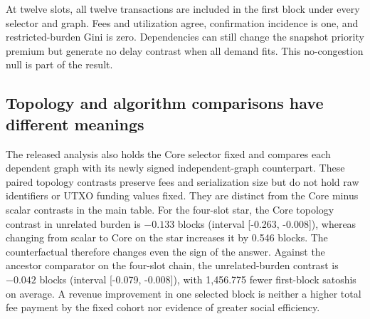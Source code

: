 At twelve slots, all twelve transactions are included in the first block under every selector and graph. Fees and utilization agree, confirmation incidence is one, and restricted-burden Gini is zero. Dependencies can still change the snapshot priority premium but generate no delay contrast when all demand fits. This no-congestion null is part of the result.

\subsection{Topology and algorithm comparisons have different meanings}
The released analysis also holds the Core selector fixed and compares each dependent graph with its newly signed independent-graph counterpart. These paired topology contrasts preserve fees and serialization size but do not hold raw identifiers or UTXO funding values fixed. They are distinct from the Core minus scalar contrasts in the main table. For the four-slot star, the Core topology contrast in unrelated burden is $-0.133$ blocks (interval [-0.263, -0.008]), whereas changing from scalar to Core on the star increases it by 0.546 blocks. The counterfactual therefore changes even the sign of the answer. Against the ancestor comparator on the four-slot chain, the unrelated-burden contrast is $-0.042$ blocks (interval [-0.079, -0.008]), with 1,456.775 fewer first-block satoshis on average. A revenue improvement in one selected block is neither a higher total fee payment by the fixed cohort nor evidence of greater social efficiency.
